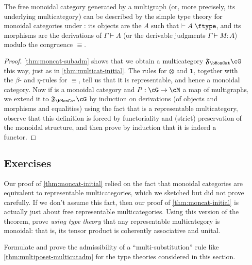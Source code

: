 \documentclass{book}
\let\types\vdash
\def\type{\;\ftype}
\newcommand{\F}[1]{\mathfrak{F}_{#1}}
\def\one{\mathbf{1}}
\let\tensor\otimes
\begin{document}
\begin{thm}\label{thm:moncat-initial}
  The free monoidal category generated by a multigraph \cG (or, more precisely, its underlying multicategory) can be described by the simple type theory for monoidal categories under \cG: its objects are the $A$ such that $\types A\type$, and its morphisms are the derivations of $\Gamma\types A$ (or the derivable judgments $\Gamma\types M:A$) modulo the congruence $\equiv$.
\end{thm}
\begin{proof}
  \cref{thm:moncat-subadm} shows that we obtain a multicategory $\F\bMonCat\cG$ this way, just as in \cref{thm:multicat-initial}.
  The rules for $\tensor$ and $\one$, together with the $\beta$- and $\eta$-rules for $\equiv$, tell us that it is representable, and hence a monoidal category.
  Now if \cM is a monoidal category and $P:\cG\to\cM$ a map of multigraphs, we extend it to $\F\bMonCat\cG$ by induction on derivations (of objects and morphisms and equalities) using the fact that \cM is a representable multicategory, observe that this definition is forced by functoriality and (strict) preservation of the monoidal structure, and then prove by induction that it is indeed a functor.
\end{proof}


\subsection*{Exercises}

\begin{ex}\label{ex:repmulticat-moncat}
  Our proof of \cref{thm:moncat-initial} relied on the fact that monoidal categories are equivalent to representable multicategories, which we sketched but did not prove carefully.
  If we don't assume this fact, then our proof of \cref{thm:moncat-initial} is actually just about free representable multicategories.
  Using this version of the theorem, prove \emph{using type theory} that any representable multicategory is monoidal: that is, its tensor product is coherently associative and unital.
\end{ex}

\begin{ex}\label{ex:moncat-multisubadm}
  Formulate and prove the admissibility of a ``multi-substitution'' rule like \cref{thm:multiposet-multicutadm} for the type theories considered in this section.
\end{ex}
\end{document}
